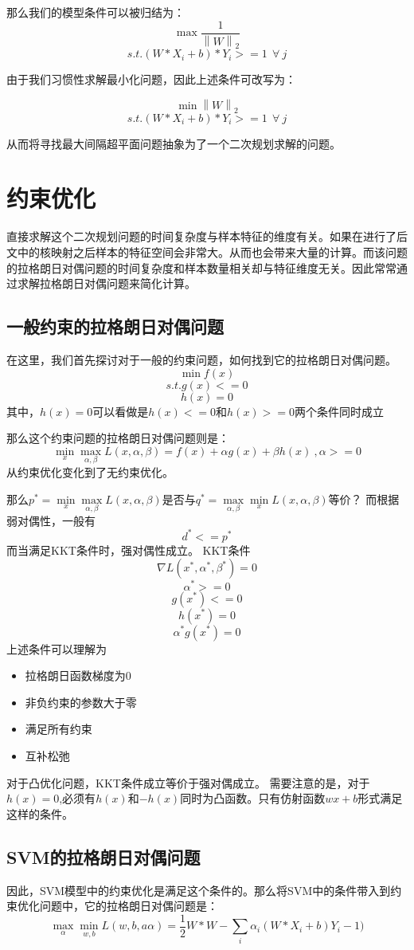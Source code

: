 \documentclass{article}
\begin{document}
那么我们的模型条件可以被归结为：
$$\max \frac {1} {\left\|W\right\|_2}$$
$$s.t. (W*X_i+b)*Y_i >=1\ \ \forall\ j$$

由于我们习惯性求解最小化问题，因此上述条件可改写为：

$$\min \left\|W\right\|_2 $$
$$s.t. (W*X_i+b)*Y_i >=1\ \ \forall\ j$$

从而将寻找最大间隔超平面问题抽象为了一个二次规划求解的问题。

\section{约束优化}
直接求解这个二次规划问题的时间复杂度与样本特征的维度有关。如果在进行了后文中的核映射之后样本的特征空间会非常大。从而也会带来大量的计算。而该问题的拉格朗日对偶问题的时间复杂度和样本数量相关却与特征维度无关。因此常常通过求解拉格朗日对偶问题来简化计算。

\subsection{一般约束的拉格朗日对偶问题}
在这里，我们首先探讨对于一般的约束问题，如何找到它的拉格朗日对偶问题。
$$\min f(x)$$
$$s.t. g(x)<=0$$
$$h(x)=0$$
其中，$h(x)=0$可以看做是$h(x)<=0$和$h(x)>=0$两个条件同时成立

那么这个约束问题的拉格朗日对偶问题则是：
$$\min\limits_x \max\limits_{\alpha,\beta} L(x,\alpha,\beta) = f(x)+\alpha g(x)+\beta h(x) \ ,\alpha>=0$$
从约束优化变化到了无约束优化。

那么$p^*=\min\limits_x \max\limits_{\alpha,\beta} L(x,\alpha,\beta)$是否与$q^*=\max\limits_{\alpha,\beta} \min\limits_x  L(x,\alpha,\beta)$等价？
而根据弱对偶性，一般有
$$d^*<=p^*$$
而当满足KKT条件时，强对偶性成立。
KKT条件
$$\nabla L(x^*,\alpha^*,\beta^*)=0$$
$$\alpha^*>=0$$
$$g(x^*)<=0$$
$$h(x^*)=0$$
$$\alpha^*g(x^*)=0$$
上述条件可以理解为
\begin{itemize}
\item 拉格朗日函数梯度为0
\item 非负约束的参数大于零
\item 满足所有约束
\item 互补松弛
\end{itemize}
对于凸优化问题，KKT条件成立等价于强对偶成立。
需要注意的是，对于$h(x)=0$,必须有$h(x)$和$-h(x)$同时为凸函数。只有仿射函数$wx+b$形式满足这样的条件。
\subsection{SVM的拉格朗日对偶问题}
因此，SVM模型中的约束优化是满足这个条件的。那么将SVM中的条件带入到约束优化问题中，它的拉格朗日对偶问题是：
$$ \max\limits_\alpha \min\limits_{w,b}L(w,b,a\alpha)=\frac 1 2 W*W-\sum\limits_i\alpha_i(W*X_i+b)Y_i-1)$$
\end{document}
